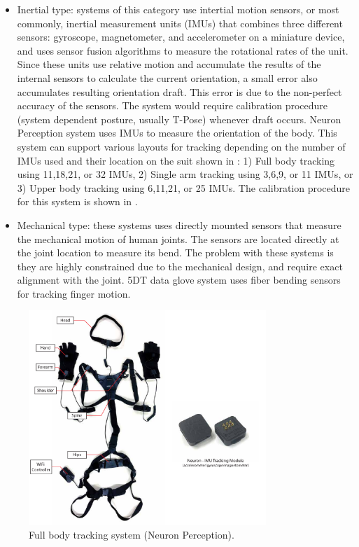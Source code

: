 \begin{enumerate}
\begin{itemize}
\item Inertial type: systems of this category use intertial motion sensors, or most commonly, inertial measurement units (IMUs) that combines three different sensors: gyroscope, magnetometer, and accelerometer on a miniature device, and uses sensor fusion algorithms to measure the rotational rates of the unit. Since these units use relative motion and accumulate the results of the internal sensors to calculate the current orientation, a small error also accumulates resulting orientation draft. This error is due to the non-perfect accuracy of the sensors. The system would require calibration procedure (system dependent posture, usually T-Pose) whenever draft occurs. Neuron Perception system uses IMUs to measure the orientation of the body. This system can support various layouts for tracking depending on the number of IMUs used and their location on the suit shown in : 1) Full body tracking using 11,18,21, or 32 IMUs, 2) Single arm tracking using 3,6,9, or 11 IMUs, or 3) Upper body tracking using 6,11,21, or 25 IMUs. The calibration procedure for this system is shown in . 

\item Mechanical type: these systems uses directly mounted sensors that measure the mechanical motion of human joints. The sensors are located directly at the joint location to measure its bend. The problem with these systems is they are highly constrained due to the mechanical design, and require exact alignment with the joint. 5DT data glove system uses fiber bending sensors for tracking finger motion.

\end{itemize}
\end{enumerate}



\begin{figure}[t!]
\centering
\captionsetup{justification=centering} 
\includegraphics[width=0.8\textwidth]{figures/system/NeuronPerceptron.pdf}
\caption{Full body tracking system (Neuron Perception).}
  \label{fig:system-neuron-overview}
\end{figure}

